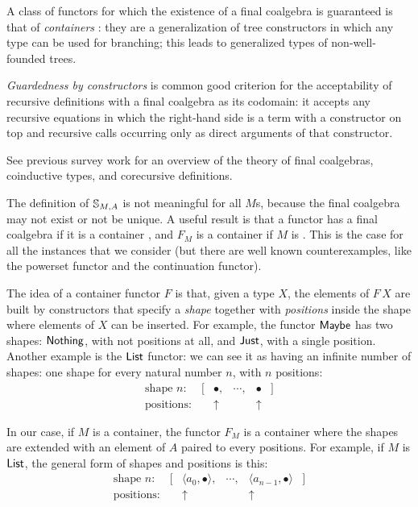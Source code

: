 A class of functors for which the existence of a final coalgebra is guaranteed is that of {\em containers} \cite{AAG:2005}: they are a generalization of tree constructors in which any type can be used for branching; this leads to generalized types of non-well-founded trees.

{\em Guardedness by constructors} is common good criterion for the acceptability of recursive definitions with a final coalgebra as its codomain: it accepts any recursive equations in which the right-hand side is a term with a constructor on top and recursive calls occurring only as direct arguments of that constructor.

See previous survey work \cite{capretta:2011} for an overview of the theory of final coalgebras, coinductive types, and corecursive definitions.

The definition of $\mathbb{S}_{M,A}$ is not meaningful for all $M$s, because the final coalgebra may not exist or not be unique.
A useful result is that a functor has a final coalgebra if it is a container \cite{AAG:2005}, and $F_M$ is a container if $M$ is \cite{capretta/fowler:2017}.
This is the case for all the instances that we consider (but there are well known counterexamples, like the powerset functor and the continuation functor).

The idea of a container functor $F$ is that, given a type $X$, the elements of $F\,X$ are built by constructors that specify a {\em shape} together with {\em positions} inside the shape where elements of $X$ can be inserted.
For example, the functor $\mathsf{Maybe}$ has two shapes: $\mathsf{Nothing}$, with not positions at all, and $\mathsf{Just}$, with a single position.
Another example is the $\mathsf{List}$ functor: we can see it as having an infinite number of shapes: one shape for every natural number $n$, with $n$ positions:
$$
\begin{array}{llcll}
\mbox{shape $n$: } \quad [ & \bullet,  & \cdots ,  & \bullet & ]\\
\mbox{positions: }     & \uparrow &       & \uparrow
\end{array}
$$

In our case, if $M$ is a container, the functor $F_M$ is a container where the shapes are extended with an element of $A$ paired to every positions.
For example, if $M$ is $\mathsf{List}$, the general form of shapes and positions is this:
$$
\begin{array}{lrcrl}
\mbox{shape $n$: } \quad [ & \langle a_0, \bullet\rangle,  
                           & \cdots ,  
                           & \langle a_{n-1}, \bullet \rangle & ]\\
\mbox{positions: }     & \uparrow\hspace{6pt} &       & \uparrow\hspace{4pt}
\end{array}
$$

